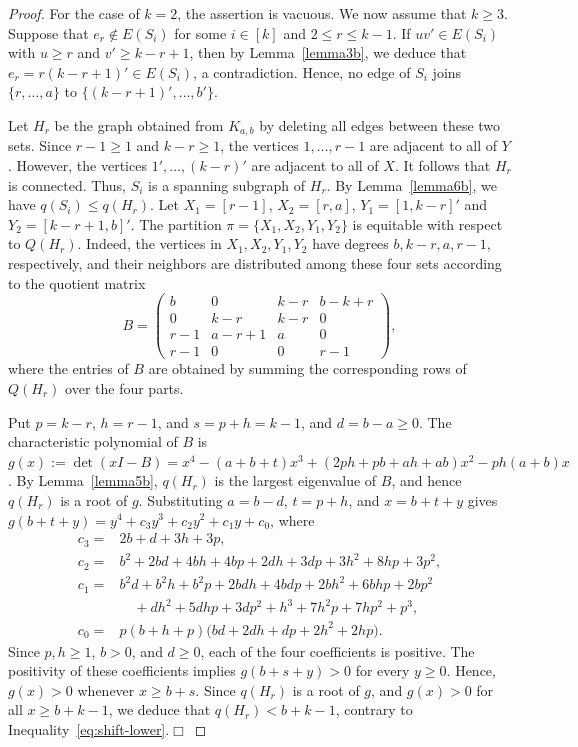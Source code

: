 \documentclass[11pt,a4paper]{article}
\theoremstyle{definition}
\numberwithin{equation}{section}
\def\qed{\hfill$\Box$\vspace{12pt}}
\begin{document}
\begin{proof}
For the case of $k=2$, the assertion is vacuous. We now assume that $k\ge3$. Suppose that $e_r\notin E(S_i)$ for some $i\in[k]$ and $2\le r\le k-1$. If $uv'\in E(S_i)$ with $u\ge r$ and $v'\ge k-r+1$, then by Lemma~\ref{lemma3b}, we deduce that $e_r=r(k-r+1)'\in E(S_i)$, a contradiction. Hence, no edge of $S_i$ joins $\{r,\ldots,a\}$ to $\{(k-r+1)',\ldots,b'\}$.

Let $H_r$ be the graph obtained from $K_{a,b}$ by deleting all edges between these two sets. Since $r-1\ge1$ and $k-r\ge1$, the vertices $1,\ldots,r-1$ are adjacent to all of $Y$. However, the vertices $1',\ldots,(k-r)'$ are adjacent to all of $X$. It follows that $H_r$ is connected. Thus, $S_i$ is a spanning subgraph of $H_r$. By Lemma~\ref{lemma6b}, we have $q(S_i)\le q(H_r)$. Let $X_1=[r-1]$, $X_2=[r,a]$, $Y_1=[1,k-r]'$ and $Y_2=[k-r+1,b]'$. The partition $\pi=\{X_1,X_2,Y_1,Y_2\}$
is equitable with respect to $Q(H_r)$. Indeed, the vertices in \(X_1,X_2,Y_1,Y_2\) have degrees \(b,k-r,a,r-1\), respectively, and their neighbors are distributed among these four sets according to the quotient matrix
\[B=\begin{pmatrix}
b&0&k-r&b-k+r\\
0&k-r&k-r&0\\
r-1&a-r+1&a&0\\
r-1&0&0&r-1
\end{pmatrix},
\]
where the entries of \(B\) are obtained by summing the corresponding rows of \(Q(H_r)\) over the four parts.

Put $p=k-r$, $h=r-1$, and $s=p+h=k-1$, and $d=b-a\ge0$. The characteristic polynomial of $B$ is
$g(x):=\det(xI-B)=x^4-(a+b+t)x^3+(2ph+pb+ah+ab)x^2-ph(a+b)x$. By Lemma~\ref{lemma5b}, $q(H_r)$ is the largest eigenvalue of $B$, and hence $q(H_r)$ is a root of $g$. Substituting $a=b-d$, $t=p+h$, and $x=b+t+y$ gives
$g(b+t+y)=y^4+c_3y^3+c_2y^2+c_1y+c_0$, where
\begin{align*}
c_3={}&2b+d+3h+3p,\\
c_2={}&b^2+2bd+4bh+4bp+2dh+3dp+3h^2+8hp+3p^2,\\
c_1={}&b^2d+b^2h+b^2p+2bdh+4bdp+2bh^2+6bhp+2bp^2\\
&\quad+dh^2+5dhp+3dp^2+h^3+7h^2p+7hp^2+p^3,\\
c_0={}&p(b+h+p)\bigl(bd+2dh+dp+2h^2+2hp\bigr).
\end{align*}
Since $p,h\ge1$, $b>0$, and $d\ge0$, each of the four coefficients is positive. The positivity of these coefficients implies $g(b+s+y)>0$ for every $y\ge0$. Hence, $g(x)>0$ whenever $x\ge b+s$. Since $q(H_r)$ is a root of $g$, and $g(x)>0$ for all
$x\ge b+k-1$, we deduce that $q(H_r)<b+k-1$, contrary to Inequality~\eqref{eq:shift-lower}.\qed
\end{proof}
\end{document}
